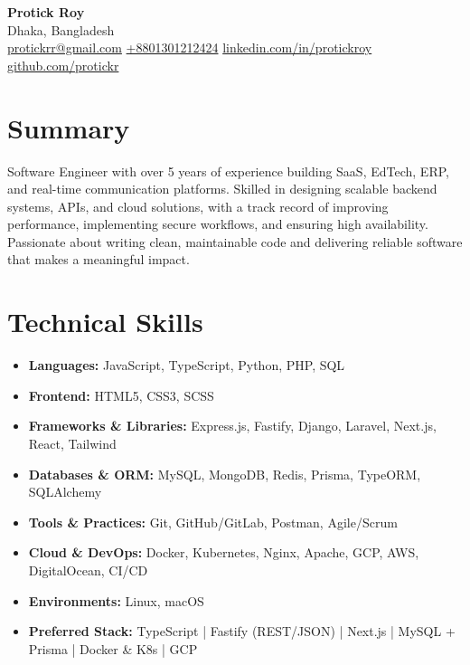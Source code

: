 \documentclass[a4paper,10pt]{article}
\begin{document}
{\LARGE \textbf{Protick Roy}}\\[-1pt]
Dhaka, Bangladesh \\
\href{mailto:protickrr@gmail.com}{protickrr@gmail.com} \textbar{} \href{tel:+8801301212424}{+8801301212424} \textbar{} 
\href{https://www.linkedin.com/in/protickroy}{linkedin.com/in/protickroy} \textbar{} 
\href{https://github.com/protickr}{github.com/protickr}

\vspace{6pt}

\section*{Summary}
Software Engineer with over 5 years of experience building SaaS, EdTech, ERP, and real-time communication platforms. 
Skilled in designing scalable backend systems, APIs, and cloud solutions, with a track record of improving performance, 
implementing secure workflows, and ensuring high availability. 
Passionate about writing clean, maintainable code and delivering reliable software that makes a meaningful impact.

\vspace{6pt}

\section*{Technical Skills}
\begin{itemize}[leftmargin=12pt]
  \item \textbf{Languages:} JavaScript, TypeScript, Python, PHP, SQL
  \item \textbf{Frontend:} HTML5, CSS3, SCSS
  \item \textbf{Frameworks \& Libraries:} Express.js, Fastify, Django, Laravel, Next.js, React, Tailwind
  \item \textbf{Databases \& ORM:} MySQL, MongoDB, Redis, Prisma, TypeORM, SQLAlchemy
  \item \textbf{Tools \& Practices:} Git, GitHub/GitLab, Postman, Agile/Scrum
  \item \textbf{Cloud \& DevOps:} Docker, Kubernetes, Nginx, Apache, GCP, AWS, DigitalOcean, CI/CD
  \item \textbf{Environments:} Linux, macOS
  \item \textbf{Preferred Stack:} TypeScript | Fastify (REST/JSON) | Next.js | MySQL + Prisma | Docker \& K8s | GCP
\end{itemize}
\end{document}
